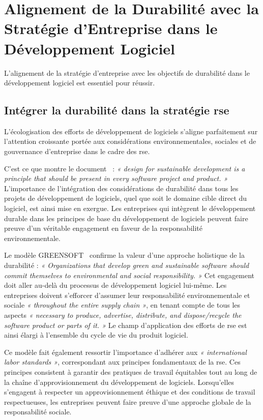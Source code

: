 
\section{Alignement de la Durabilité avec la Stratégie d'Entreprise dans le Développement Logiciel}
\label{sec:rse-durabilite}


L'alignement de la stratégie d'entreprise avec les objectifs de durabilité dans le développement logiciel est essentiel pour réussir.

\subsection{Intégrer la durabilité dans la stratégie \acrshort{rse}}
L'écologisation des efforts de développement de logiciels s'aligne parfaitement sur l'attention croissante portée aux considérations environnementales, sociales et de gouvernance d'entreprise dans le cadre des \acrshort{rse}.


C'est ce que montre le document~\cite{GreenAgileMethods} : \emph{« design for sustainable development is a principle that should be present in every software project and product. »} L'importance de l'intégration des considérations de durabilité dans tous les projets de développement de logiciels, quel que soit le domaine cible direct du logiciel, est ainsi mise en exergue. Les entreprises qui intègrent le développement durable dans les principes de base du développement de logiciels peuvent faire preuve d'un véritable engagement en faveur de la responsabilité environnementale.


Le modèle GREENSOFT~\cite{GreenAgileMethods} confirme la valeur d'une approche holistique de la durabilité : \emph{« Organizations that develop green and sustainable software should commit themselves to environmental and social responsibility. »} Cet engagement doit aller au-delà du processus de développement logiciel lui-même. Les entreprises doivent s'efforcer d'assumer leur responsabilité environnementale et sociale \emph{« throughout the entire supply chain »}, en tenant compte de tous les aspects \emph{« necessary to produce, advertise, distribute, and dispose/recycle the software product or parts of it. »} Le champ d'application des efforts de \acrshort{rse} est ainsi élargi à l'ensemble du cycle de vie du produit logiciel.


Ce modèle fait également ressortir l'importance d'adhérer aux \emph{« international labor standards »}, correspondant aux principes fondamentaux de la \acrshort{rse}. Ces principes consistent à garantir des pratiques de travail équitables tout au long de la chaîne d'approvisionnement du développement de logiciels. Lorsqu'elles s'engagent à respecter un approvisionnement éthique et des conditions de travail respectueuses, les entreprises peuvent faire preuve d'une approche globale de la responsabilité sociale.


